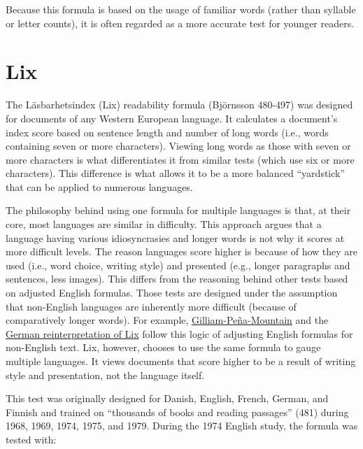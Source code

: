 \documentclass[
]{book}
\def\igobble#1{}
\theoremstyle{definition}
\theoremstyle{definition}
\theoremstyle{definition}
\theoremstyle{definition}
\theoremstyle{remark}
\begin{document}
Because this formula is based on the usage of familiar words (rather than syllable or letter counts), it is often regarded as a more accurate test for younger readers.


\newpage

\hypertarget{lix-test}{%
\section{\texorpdfstring{Lix}{Lix}}\label{lix-test}}

The Läsbarhetsindex (Lix)\index{Lix!zzzzz@\igobble|seealso{Rix}} readability formula (Björnsson 480-497) was designed for documents of any Western European language. It calculates a document's index score based on sentence length and number of long words (i.e., words containing seven or more characters). Viewing long words as those with seven or more characters is what differentiates it from similar tests (which use six or more characters). This difference is what allows it to be a more balanced ``yardstick'' that can be applied to numerous languages.

The philosophy behind using one formula for multiple languages is that, at their core, most languages are similar in difficulty. This approach argues that a language having various idiosyncrasies and longer words is not why it scores at more difficult levels. The reason languages score higher is because of how they are used (i.e., word choice, writing style) and presented (e.g., longer paragraphs and sentences, less images). This differs from the reasoning behind other tests based on adjusted English formulas. Those tests are designed under the assumption that non-English languages are inherently more difficult (because of comparatively longer words). For example, \protect\hyperlink{gilliam-pena-mountain-fry-graph}{Gilliam-Peña-Mountain} and the \protect\hyperlink{lix-german-technical}{German reinterpretation of Lix} follow this logic of adjusting English formulas for non-English text. Lix, however, chooses to use the same formula to gauge multiple languages. It views documents that score higher to be a result of writing style and presentation, not the language itself.

This test was originally designed for Danish, English, French, German, and Finnish and trained on ``thousands of books and reading passages'' (481) during 1968, 1969, 1974, 1975, and 1979. During the 1974 English study, the formula was tested with:
\end{document}
